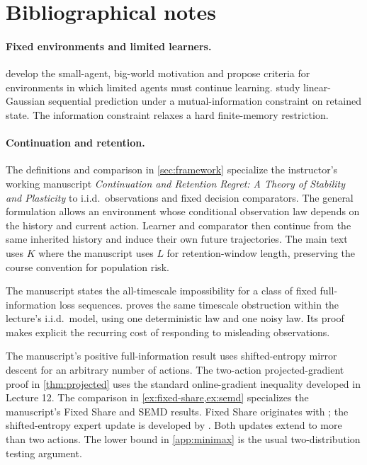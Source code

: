 \documentclass[11pt,twoside]{article}
\theoremstyle{definition}
\theoremstyle{remark}
\begin{document}
\printendnotes

\section*{Bibliographical notes}

\paragraph{Fixed environments and limited learners.}
\citet{kumar2024} develop the small-agent, big-world motivation and
propose criteria for environments in which limited agents must continue
learning. \citet{wen2025} study linear-Gaussian sequential prediction under
a mutual-information constraint on retained state. The information constraint
relaxes a hard finite-memory restriction.

\paragraph{Continuation and retention.}
The definitions and comparison in \cref{sec:framework} specialize the
instructor's working manuscript \emph{Continuation and Retention Regret:
A Theory of Stability and Plasticity} to i.i.d.\ observations and fixed
decision comparators. The general formulation allows an environment whose
conditional observation law depends on the history and current action.
Learner and comparator then continue from the same inherited history and
induce their own future trajectories.
The main text uses $K$ where the manuscript uses $L$ for retention-window
length, preserving the course convention for population risk.

The manuscript states the all-timescale impossibility for a class of fixed
full-information loss sequences.  proves the same
timescale obstruction within the lecture's i.i.d.\ model, using one
deterministic law and one noisy law. Its proof makes explicit the recurring
cost of responding to misleading observations.

The manuscript's positive full-information result uses shifted-entropy
mirror descent for an arbitrary number of actions. The two-action
projected-gradient proof in \cref{thm:projected} uses the standard
online-gradient inequality developed in Lecture 12.
The comparison in \cref{ex:fixed-share,ex:semd} specializes the manuscript's
Fixed Share and SEMD results. Fixed Share originates with
\citet{herbster1998}; the shifted-entropy expert update is developed by
\citet{buchbinder2012}. Both updates extend to more than two actions.
The lower bound in \cref{app:minimax} is the usual two-distribution
testing argument.
\end{document}
